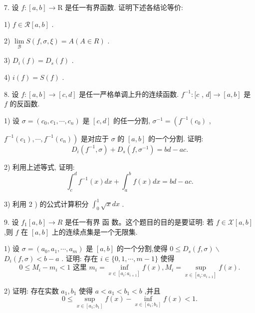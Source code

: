 7. 设 $f : \left\lbrack  {a,b}\right\rbrack   \rightarrow  \mathrm{R}$ 是任一有界函数. 证明下述各结论等价:

1) $f \in  \mathcal{R}\left\lbrack  {a,b}\right\rbrack$ .

2) $\mathop{\lim }\limits_{\mathcal{B}}S\left( {f,\sigma ,\xi }\right)  = A\left( {A \in  R}\right)$ .

3) ${D}_{i}\left( f\right)  = {D}_{s}\left( f\right)$ .

4) $i\left( f\right)  = S\left( f\right)$ .

8. 设 $f : \left\lbrack  {a,b}\right\rbrack   \rightarrow  \left\lbrack  {c,d}\right\rbrack$ 是任一严格单调上升的连续函数. ${f}^{-1} : \lbrack c$ , $d\rbrack  \rightarrow  \left\lbrack  {a,b}\right\rbrack$ 是 $f$ 的反函数.

1) 设 $\sigma  = \left( {{c}_{0},{c}_{1},\cdots ,{c}_{n}}\right)$ 是 $\left\lbrack  {c,d}\right\rbrack$ 的任一分割, ${\sigma }^{-1} = \left( {{f}^{-1}\left( {c}_{0}\right) }\right.$ ,

$\left. {{f}^{-1}\left( {c}_{1}\right) ,\cdots ,{f}^{-1}\left( {c}_{n}\right) }\right)$ 是对应于 $\sigma$ 的 $\left\lbrack  {a,b}\right\rbrack$ 的一个分割. 证明:
$${D}_{i}\left( {{f}^{-1},\sigma }\right)  + {D}_{s}\left( {f,{\sigma }^{-1}}\right)  = {bd} - {ac}.$$

2) 利用上述等式, 证明:
$${\int }_{c}^{d}{f}^{-1}\left( x\right) {dx} + {\int }_{a}^{b}f\left( x\right) {dx} = {bd} - {ac}.$$

3) 利用 2 ) 的公式计算积分 ${\int }_{0}^{1}\sqrt{x}{dx}$ .

9. 设 ${f}_{1}\left\lbrack  {a,b}\right\rbrack   \rightarrow  R$ 是任一有界 函 数。这个题目的目的是要证明: 若 $f \in  \mathcal{X}\left\lbrack  {a,b}\right\rbrack$ ,则 $f$ 在 $\left\lbrack  {a,b}\right\rbrack$ 上的连续点集是一个无限集.

1) 设 $\sigma  = \left( {{a}_{0},{a}_{1},\cdots ,{a}_{m}}\right)$ 是 $\left\lbrack  {a,b}\right\rbrack$ 的一个分割,使得 $0 \leq  {D}_{s}\left( {f,\sigma }\right)  \smallsetminus$  ${D}_{i}\left( {f,\sigma }\right)  < b - a$ . 证明: 存在 $i \in  \{ 0,1,\cdots ,m - 1\}$ 使得
$$0 \leq  {M}_{i} - {m}_{i} < 1\text{ 这里 }{m}_{i} = \mathop{\inf }\limits_{{x \in  \left\lbrack  {{a}_{i} : {a}_{i + 1}}\right\rbrack  }}f\left( x\right) ,{M}_{i} = \mathop{\sup }\limits_{{x \in  \left\lbrack  {{a}_{i} : {a}_{i + 1}}\right\rbrack  }}f\left( x\right) .$$

2) 证明: 存在实数 ${a}_{1},{b}_{1}$ 使得 $a < {a}_{1} < {b}_{1} < b$ ,并且
$$0 \leq  \mathop{\sup }\limits_{{x \in  \left\lbrack  {{a}_{1};{b}_{1}}\right\rbrack  }}f\left( x\right)  - \mathop{\inf }\limits_{{x \in  \left\lbrack  {{a}_{1};{b}_{1}}\right\rbrack  }}f\left( x\right)  < 1.$$

